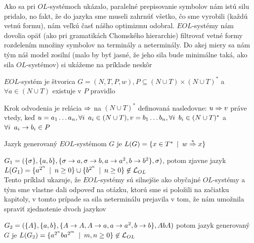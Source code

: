 Ako sa pri $OL$-systémoch ukázalo, paralelné prepisovanie symbolov
nám istú silu pridalo, no fakt, že do jazyka sme museli zahrnúť
všetko, čo sme vyrobili (každú vetnú formu), nám veľkú časť nášho
optimizmu odobral. $EOL$-systémy nám dovolia opäť (ako pri
gramatikách Chomského hierarchie) filtrovať vetné formy rozdelením
množiny symbolov na terminály a neterminály. Do akej miery sa nám
tým náš model zosilní (malo by byť jasné, že jeho sila bude
minimálne taká, ako sila $OL$-systémov) si ukážeme na príklade
neskôr

\begin{definicia}
    $EOL$-systém je štvorica $G=(N,T,P,w), P\subseteq (N\cup
    T)\times(N\cup T)^{*}$ a $\forall a\in (N\cup T)$ existuje v $P$
    pravidlo
\end{definicia}

\begin{definicia}
    Krok odvodenia je relácia $\Rightarrow$ na $(N\cup T)^{*}$ definovaná
    nasledovne: \mbox{$u\Rightarrow v$} práve vtedy, keď $u=a_{1}\dots
    a_{n},\forall i\enspace a_{i}\in(N\cup T),v=b_{1}\dots b_{n},\forall
    i\enspace b_{i}\in(N\cup T)^{*}$ a $\forall i\enspace a_{i}\rightarrow b_{i}\in P$
\end{definicia}

\begin{definicia}
    Jazyk generovaný $EOL$-systémom $G$ je $L(G)=\{x\in T^{*}\enspace |\enspace
    w\overset{*}{\Rightarrow} x\}$
\end{definicia}

\begin{priklad}
    $G_{1}=(\{\sigma\},\{a,b\},\{\sigma\rightarrow a,\sigma\rightarrow b,a\rightarrow
    a^{2},b\rightarrow b^{2}\},\sigma)$, potom zjavne jazyk
    $L(G_{1})=\{a^{2^{n}}\enspace |\enspace n\geq0 \}\cup\{b^{2^{n}}\enspace |\enspace
    n\geq0\}\not\in\mathcal{L}_{OL}$\\ Tento príklad ukazuje, že
    $EOL$-systémy sú silnejšie ako obyčajné $OL$-systémy a tým sme
    vlastne dali odpoveď na otázku, ktorú sme si položili na začiatku
    kapitoly, v tomto prípade sa sila neterminálu prejavila v tom, že
    nám umožnila spraviť zjednotenie dvoch jazykov
\end{priklad}

\begin{priklad}
    $G_{2}=(\{A\},\{a,b\},\{A\rightarrow A,A\rightarrow a,a\rightarrow a^{2},b\rightarrow b\},AbA)$
    potom jazyk ge\-ne\-ro\-va\-ný $G$ je
    $L(G_{2})=\{a^{2^{n}}ba^{2^{m}}\enspace |\enspace
    m,n\geq0\}\not\in\mathcal{L}_{OL}$
\end{priklad}

